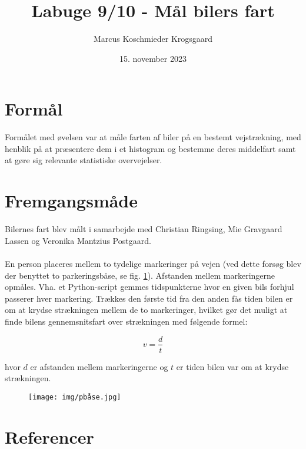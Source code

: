 \documentclass[hidelinks]{article}
\title{Labuge 9/10 - Mål bilers fart}
\author{Marcus Koschmieder Krogsgaard}
\date{15. november 2023}
\begin{document}
\maketitle

\section{Formål}
Formålet med øvelsen var at måle farten af biler på en bestemt vejstrækning, med henblik på at præsentere dem i et histogram og bestemme deres middelfart samt at gøre sig relevante statistiske overvejelser.

\section{Fremgangsmåde}
Bilernes fart blev målt i samarbejde med Christian Ringsing, Mie Gravgaard Lassen og Veronika Mantzius Postgaard.\\
\\En person placeres mellem to tydelige markeringer på vejen (ved dette forsøg blev der benyttet to parkeringsbåse, se fig. \ref{fig:pplads}). Afstanden mellem markeringerne opmåles. Vha. et Python-script\cite{timescript} gemmes tidspunkterne hvor en given bils forhjul passerer hver markering. Trækkes den første tid fra den anden fås tiden bilen er om at krydse strækningen mellem de to markeringer, hvilket gør det muligt at finde bilens gennemsnitsfart over strækningen med følgende formel:

\[v = \frac{d}{t}\]

hvor $d$ er afstanden mellem markeringerne og $t$ er tiden bilen var om at krydse strækningen.

\begin{figure}[H]
    \centering
    \texttt{[image: img/pbåse.jpg]}
    \caption{}
    \label{fig:pplads}
\end{figure}


\section{Referencer}
\printbibliography[
heading=none
]
\end{document}
